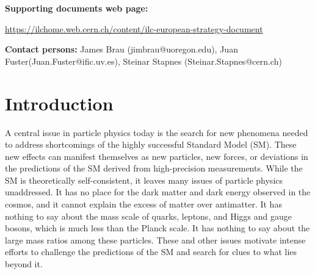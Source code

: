 \documentclass[%
reprint,
 floatfix,
 amsmath,amssymb,
 aps,
]{revtex4-1}
\newcommand{\todo}[1]{\textcolor{red}{{#1}}}
\begin{document}
\maketitle
\onecolumngrid
\textbf{Supporting documents web page:} 

\vspace{-0.8cm}
\url{https://ilchome.web.cern.ch/content/ilc-european-strategy-document}

\textbf{Contact persons:} 
James Brau (jimbrau@uoregon.edu), Juan Fuster(Juan.Fuster@ific.uv.es), Steinar Stapnes (Steinar.Stapnes@cern.ch)
\vspace{1cm}

\pagebreak

\pagestyle{plain}
\setcounter{page}{1}

\twocolumngrid



\vspace{-.4cm}

\section{\label{sec:intro}Introduction}

\vspace{-.3cm}


A central issue in particle physics today is the search for new
 phenomena needed to address shortcomings of the 
highly successful Standard Model (SM).  These new effects can manifest
themselves as new particles, new forces, 
 or deviations in the predictions of the SM derived from
 high-precision measurements. While the SM is theoretically
 self-consistent,
it leaves many issues of particle physics unaddressed. 
It has no place for the dark matter and dark energy observed in the
cosmos,
and it cannot explain the excess of matter over antimatter.   It has
nothing to say about the mass scale of quarks, leptons, and Higgs and gauge 
bosons, which is much less than the Planck scale.   It has nothing 
to say about the large mass ratios among these particles.   These and 
other issues motivate intense efforts to challenge the predictions of
the SM and search for clues to what lies beyond it.
 
\end{document}

